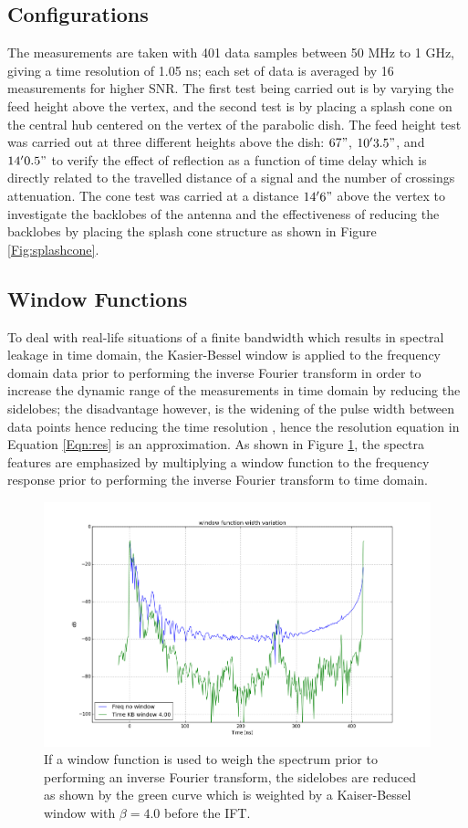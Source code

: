 \documentclass[preprint]{aastex}  %
\begin{document}
\subsection{Configurations}
The measurements are taken with 401 data samples between 50 MHz to 1 GHz, giving a time resolution of 1.05 ns; each set of data is averaged by 16 measurements for higher SNR. The first test being carried out is by varying the feed height above the vertex, and the second test is by placing a splash cone on the central hub centered on the vertex of the parabolic dish. The feed height test was carried out at three different heights above the dish: $67"$, $10'3.5"$, and $14'0.5"$ to verify the effect of reflection as a function of time delay which is directly related to the travelled distance of a signal and the number of crossings attenuation. The cone test was carried at a distance $14' 6"$ above the vertex to investigate the backlobes of the antenna and the effectiveness of reducing the backlobes by placing the splash cone structure as shown in Figure \ref{Fig:splashcone}.
\subsection{Window Functions}
To deal with real-life situations of a finite bandwidth which results in spectral leakage in time domain,  the Kasier-Bessel window is applied to the frequency domain data prior to performing the inverse Fourier transform in order to increase the dynamic range of the measurements in time domain by reducing the sidelobes; the disadvantage however, is the widening of the pulse width between data points hence reducing the time resolution , hence the resolution equation in Equation \ref{Eqn:res} is an approximation. As shown in Figure \ref{Fig:window}, the spectra features are emphasized by multiplying a window function to the frequency response prior to performing the inverse Fourier transform to time domain. 
\begin{figure}[H]
	\begin{center}
	\includegraphics[width =.8\textwidth]{./reflectometry_plots/win_nowin}
	\caption{If a window function is used to weigh the spectrum prior to performing an inverse Fourier transform, the sidelobes are reduced as shown by the green curve which is weighted by a Kaiser-Bessel window with $\beta = 4.0$ before the IFT.
\label{Fig:window}}
	\end{center}
\end{figure}
\end{document}
